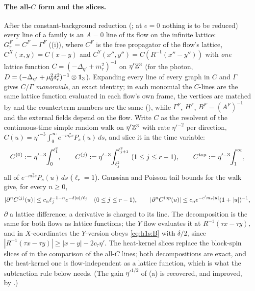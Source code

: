 \paragraph{The all-$C$ form and the slices.}
After the constant-background reduction (; at $e=0$ nothing is to be reduced) every line of a family is an $A=0$ line of its flow on the infinite lattice: $G^F_r=C^F-\Gamma^F$ ((i)), where $C^F$ is the free propagator of the flow's lattice, $C^X(x,y)=C(x-y)$ and $C^Y(x'',y'')=C(R^{-1}(x''-y''))$ with \emph{one} lattice function $C=(-\Delta_{\eta'}+m_r^2)^{-1}$ on $\eta'\mathbb Z^3$ (for the photon, $D=(-\Delta_{\eta'}+\mu_0^2\delta_r^2)^{-1}\otimes\mathbf 1_3$). Expanding every line of every graph in $C$ and $\Gamma$ gives \emph{$C/\Gamma$ monomials}, an exact identity; in each monomial the $C$-lines are the same lattice function evaluated in each flow's own frame, the vertices are matched by  and the counterterm numbers are the same (), while $\Gamma^F$, $H^F$, $B^F=(A^F)^{-1}$ and the external fields depend on the flow. Write $C$ as the resolvent of the continuous-time simple random walk on $\eta'\mathbb Z^3$ with rate $\eta'^{-2}$ per direction, $C(u)=\eta'^{-3}\int_0^\infty e^{-m_r^2s}P_s(u)\,ds$, and slice it in the time variable:
\[
C^{(0)}:=\eta'^{-3}\!\int_0^{\ell_1^2},\qquad C^{(j)}:=\eta'^{-3}\!\int_{\ell_j^2}^{\ell_{j+1}^2}\ (1\le j\le r-1),\qquad C^{\rm top}:=\eta'^{-3}\!\int_1^\infty,
\]
all of $e^{-m_r^2s}P_s(u)\,ds$ ($\ell_r=1$). Gaussian and Poisson tail bounds for the walk give, for every $n\ge0$,
\begin{equation}\label{eq:h1s:B}
|\partial^nC^{(j)}(u)|\le c_n\ell_j^{-1-n}e^{-\delta|u|/\ell_j}\quad(0\le j\le r-1),\qquad|\partial^nC^{\rm top}(u)|\le c_ne^{-c'm_r|u|}(1+|u|)^{-1},
\end{equation}
$\partial$ a lattice difference; a derivative is charged to its line. The decomposition is the same for both flows as lattice functions; the $Y$ flow evaluates it at $R^{-1}(\tau x-\tau y)$, and in $X$-coordinates the $Y$-version obeys \eqref{eq:h1s:B} with $\delta/2$, since $|R^{-1}(\tau x-\tau y)|\ge|x-y|-2c_\tau\eta'$. The heat-kernel slices replace the block-spin slices of  in the comparison of the all-$C$ lines; both decompositions are exact, and the heat-kernel one is flow-independent as a lattice function, which is what the subtraction rule below needs. (The gain $\eta'^{1/2}$ of (a) is recovered, and improved, by .)

